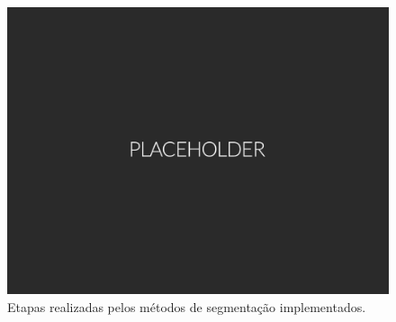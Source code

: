 \begin{figure}[htb]
	\label{flow:MTDs}
	\caption{Etapas realizadas pelos métodos de segmentação implementados.}
	\begin{center}
	    \includegraphics[width=0.75\linewidth]{./img/placeholder.png}
	\end{center}
\end{figure}